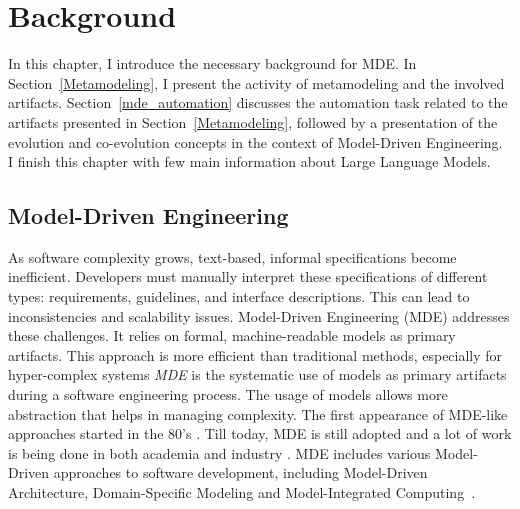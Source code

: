 \clearemptydoublepage
\chapter{Background}
\label{background}

In this chapter, I introduce the necessary background for MDE. In Section~\ref{Metamodeling}, I present the activity of metamodeling and the involved artifacts. Section~\ref{mde_automation} discusses the automation task related to the artifacts presented in Section~\ref{Metamodeling}, followed by a presentation of the evolution and co-evolution concepts in the context of Model-Driven Engineering. I finish this chapter with few main information about Large Language Models.

\section{Model-Driven Engineering}
\label{mde}
As software complexity grows, text-based, informal specifications become inefficient. Developers must manually interpret these specifications of different types: requirements, guidelines, and interface descriptions. This can lead to inconsistencies and scalability issues. Model-Driven Engineering (MDE) addresses these challenges. It relies on formal, machine-readable models as primary artifacts. This approach is more efficient than traditional methods, especially for hyper-complex systems
\textit{MDE} is the systematic use of models as primary artifacts during a software engineering process. The usage of models allows more abstraction that helps in managing complexity. The first appearance of MDE-like approaches started in the 80's \cite{10.1007/s10270-005-0079-0}. Till today, MDE is still adopted  and a lot of work is being done in both academia and industry \cite{Mohagheghi2009,mohagheghi2008proof,jongeling2022Structural,wortmann2020modeling}. MDE includes various Model-Driven approaches to software development, including Model-Driven Architecture, Domain-Specific Modeling and Model-Integrated Computing~\cite{10.1145/1985793.1985882}. 



